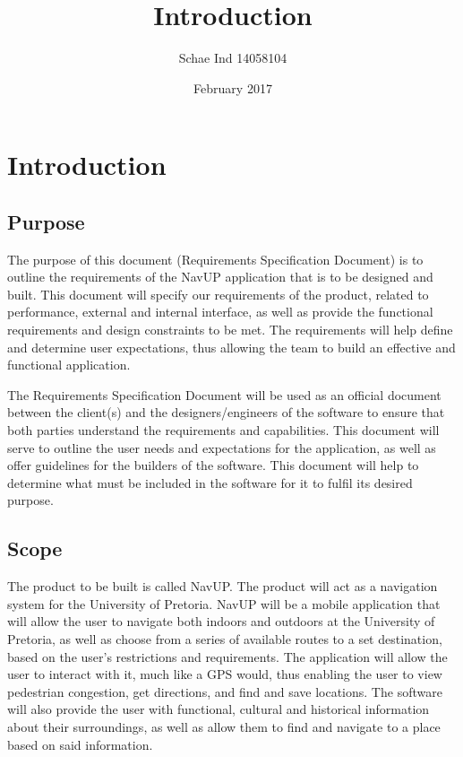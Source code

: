 \documentclass[11pt]{article}
\title{Introduction}
\author{Schae Ind 14058104 }
\date{February 2017}
\begin{document}
\section{Introduction}
	\subsection{Purpose}

	The purpose of this document (Requirements Specification Document) is to outline the requirements of the NavUP application that is to be designed and built. This document will specify our requirements of the product, related to performance, external and internal interface, as well as provide the functional requirements and design constraints to be met. The requirements will help define and determine user expectations, thus allowing the team to build an effective and functional application. 

\vspace{\baselineskip}
The Requirements Specification Document will be used as an official document between the client(s) and the designers/engineers of the software to ensure that both parties understand the requirements and capabilities. This document will serve to outline the user needs and expectations for the application, as well as offer guidelines for the builders of the software. This document will help to determine what must be included in the software for it to fulfil its desired purpose.


	\subsection{Scope}

	The product to be built is called NavUP. The product will act as a navigation system for the University of Pretoria. NavUP will be a mobile application that will allow the user to navigate both indoors and outdoors at the University of Pretoria, as well as choose from a series of available routes to a set destination, based on the user’s restrictions and requirements. The application will allow the user to interact with it, much like a GPS would, thus enabling the user to view pedestrian congestion, get directions, and find and save locations. The software will also provide the user with functional, cultural and historical information about their surroundings, as well as allow them to find and navigate to a place based on said information.
\vspace{\baselineskip}
\end{document}
